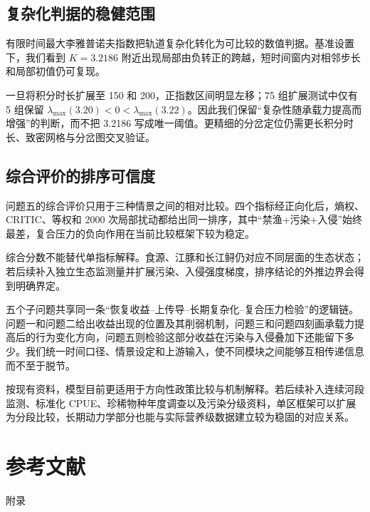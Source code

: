 \documentclass{MMCStyle}
\begin{document}
\subsection{复杂化判据的稳健范围}
有限时间最大李雅普诺夫指数把轨道复杂化转化为可比较的数值判据。基准设置下，我们看到 $K=3.2186$ 附近出现局部由负转正的跨越，短时间窗内对相邻步长和局部初值仍可复现。

一旦将积分时长扩展至 150 和 200，正指数区间明显左移；75 组扩展测试中仅有 5 组保留 $\lambda_{\max}(3.20)<0<\lambda_{\max}(3.22)$。因此我们保留“复杂性随承载力提高而增强”的判断，而不把 3.2186 写成唯一阈值。更精细的分岔定位仍需更长积分时长、致密网格与分岔图交叉验证。

\subsection{综合评价的排序可信度}
问题五的综合评价只用于三种情景之间的相对比较。四个指标经正向化后，熵权、CRITIC、等权和 2000 次局部扰动都给出同一排序，其中“禁渔+污染+入侵”始终最差，复合压力的负向作用在当前比较框架下较为稳定。

综合分数不能替代单指标解释。食源、江豚和长江鲟仍对应不同层面的生态状态；若后续补入独立生态监测量并扩展污染、入侵强度梯度，排序结论的外推边界会得到明确界定。

\noindent 五个子问题共享同一条“恢复收益--上传导--长期复杂化--复合压力检验”的逻辑链。问题一和问题二给出收益出现的位置及其削弱机制，问题三和问题四刻画承载力提高后的行为变化方向，问题五则检验这部分收益在污染与入侵叠加下还能留下多少。我们统一时间口径、情景设定和上游输入，使不同模块之间能够互相传递信息而不至于脱节。

\noindent 按现有资料，模型目前更适用于方向性政策比较与机制解释。若后续补入连续河段监测、标准化 CPUE、珍稀物种年度调查以及污染分级资料，单区框架可以扩展为分段比较，长期动力学部分也能与实际营养级数据建立较为稳固的对应关系。

\section{参考文献}
\printbibliography[heading=none]

\appendix
\begin{center}
\heiti{} 附\hspace{1pc}录
\end{center}
\end{document}
